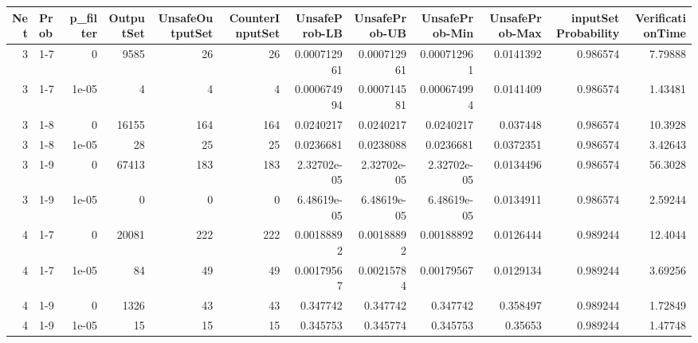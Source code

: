 \begin{tabular}{rlrrrrrrrrrr}
\hline
   Net & Prob   &   p\_filter &   OutputSet &   UnsafeOutputSet &   CounterInputSet &   UnsafeProb-LB &   UnsafeProb-UB &   UnsafeProb-Min &   UnsafeProb-Max &   inputSet Probability &   VerificationTime \\
\hline
     3 & 1-7    &      0     &        9585 &                26 &                26 &     0.000712961 &     0.000712961 &      0.000712961 &        0.0141392 &               0.986574 &            7.79888 \\
     3 & 1-7    &      1e-05 &           4 &                 4 &                 4 &     0.000674994 &     0.000714581 &      0.000674994 &        0.0141409 &               0.986574 &            1.43481 \\
     3 & 1-8    &      0     &       16155 &               164 &               164 &     0.0240217   &     0.0240217   &      0.0240217   &        0.037448  &               0.986574 &           10.3928  \\
     3 & 1-8    &      1e-05 &          28 &                25 &                25 &     0.0236681   &     0.0238088   &      0.0236681   &        0.0372351 &               0.986574 &            3.42643 \\
     3 & 1-9    &      0     &       67413 &               183 &               183 &     2.32702e-05 &     2.32702e-05 &      2.32702e-05 &        0.0134496 &               0.986574 &           56.3028  \\
     3 & 1-9    &      1e-05 &           0 &                 0 &                 0 &     6.48619e-05 &     6.48619e-05 &      6.48619e-05 &        0.0134911 &               0.986574 &            2.59244 \\
     4 & 1-7    &      0     &       20081 &               222 &               222 &     0.00188892  &     0.00188892  &      0.00188892  &        0.0126444 &               0.989244 &           12.4044  \\
     4 & 1-7    &      1e-05 &          84 &                49 &                49 &     0.00179567  &     0.00215784  &      0.00179567  &        0.0129134 &               0.989244 &            3.69256 \\
     4 & 1-9    &      0     &        1326 &                43 &                43 &     0.347742    &     0.347742    &      0.347742    &        0.358497  &               0.989244 &            1.72849 \\
     4 & 1-9    &      1e-05 &          15 &                15 &                15 &     0.345753    &     0.345774    &      0.345753    &        0.35653   &               0.989244 &            1.47748 \\
\hline
\end{tabular}
